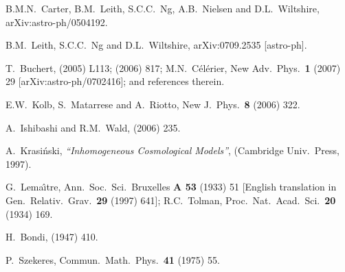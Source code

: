 \documentclass[12pt]{iopart}
\begin{document}
\begin{thebibliography}{66}
B.M.N.~Carter, B.M.~Leith, S.C.C.~Ng, A.B.~Nielsen and D.L.~Wiltshire,
arXiv:astro-ph/0504192.

B.M.~Leith, S.C.C.~Ng and D.L.~Wiltshire,
arXiv:0709.2535 [astro-ph].

T.~Buchert,
 (2005) L113; %
 (2006) 817; %
M.N.~C\'el\'erier,
New Adv.\ Phys.\ {\bf1} (2007) 29 [arXiv:astro-ph/0702416];
and references therein.

E.W.~Kolb, S.~Matarrese and A.~Riotto,
New J.\ Phys.\ {\bf8} (2006) 322. %

A.~Ishibashi and R.M.~Wald,
 (2006) 235. %

A.~Krasi\'nski, {\em``Inhomogeneous Cosmological Models''},
(Cambridge Univ.\ Press, 1997).

G.~Lema\^{\i}tre,
Ann.\ Soc.\ Sci.\ Bruxelles {\bf A 53} (1933) 51
[English translation in Gen.\ Relativ.\ Grav.\ {\bf29} (1997) 641];
R.C.~Tolman,
Proc.\ Nat.\ Acad.\ Sci.\ {\bf 20} (1934) 169.

H.~Bondi,
 (1947) 410.

P.~Szekeres,
Commun.\ Math.\ Phys.\ {\bf 41} (1975) 55.


\end{thebibliography}
\end{document}
